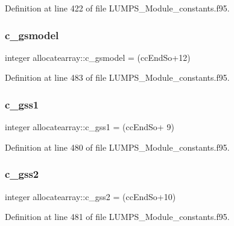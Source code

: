 Definition at line 422 of file L\+U\+M\+P\+S\+\_\+\+Module\+\_\+constants.\+f95.

\mbox{\label{namespaceallocatearray_a0372ecc61cfb88ee683fac861aab87ac}} 
\subsubsection{\texorpdfstring{c\+\_\+gsmodel}{c\_gsmodel}}
{\footnotesize\ttfamily integer allocatearray\+::c\+\_\+gsmodel = (cc\+End\+So+12)}



Definition at line 483 of file L\+U\+M\+P\+S\+\_\+\+Module\+\_\+constants.\+f95.

\mbox{\label{namespaceallocatearray_aee67f7f4bcae37b7727fdeeb7570e7de}} 
\subsubsection{\texorpdfstring{c\+\_\+gss1}{c\_gss1}}
{\footnotesize\ttfamily integer allocatearray\+::c\+\_\+gss1 = (cc\+End\+So+ 9)}



Definition at line 480 of file L\+U\+M\+P\+S\+\_\+\+Module\+\_\+constants.\+f95.

\mbox{\label{namespaceallocatearray_af79468bbe3d4485e8a4f27d33c674864}} 
\subsubsection{\texorpdfstring{c\+\_\+gss2}{c\_gss2}}
{\footnotesize\ttfamily integer allocatearray\+::c\+\_\+gss2 = (cc\+End\+So+10)}



Definition at line 481 of file L\+U\+M\+P\+S\+\_\+\+Module\+\_\+constants.\+f95.

\mbox{\label{namespaceallocatearray_abf62bf3e83784366ed95fdfaae1f1d92}} 
